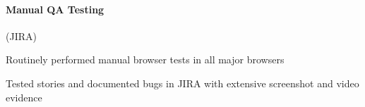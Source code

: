 \begin{position}
  \paragraph{Manual QA Testing} (JIRA)
  \begin{myitem}
  \item Routinely performed manual browser tests in all major browsers
  \item Tested stories and documented bugs in JIRA with extensive screenshot and video evidence
  \end{myitem}
\end{position}
%
%

